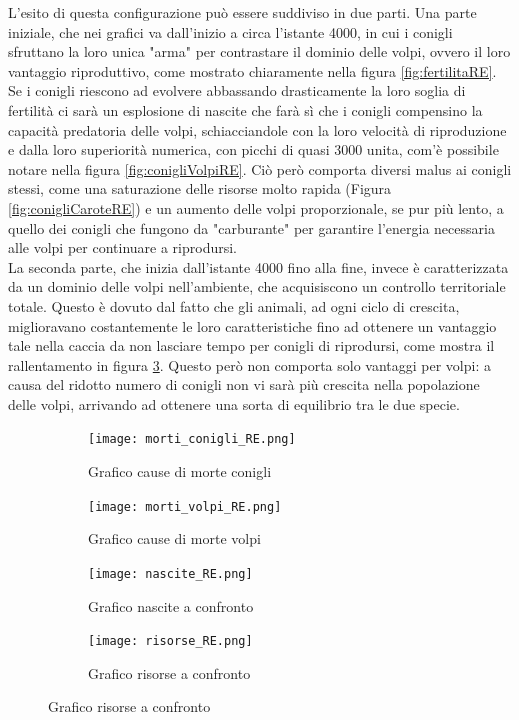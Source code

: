 \documentclass[11pt]{article}
\begin{document}
L'esito di questa configurazione può essere suddiviso in due parti. Una parte iniziale, che nei grafici va dall'inizio a circa l'istante 4000, in cui i conigli sfruttano la loro unica "arma" per contrastare il dominio delle volpi, ovvero il loro vantaggio riproduttivo, come mostrato chiaramente nella figura \ref{fig:fertilitaRE}. Se i conigli riescono ad evolvere abbassando drasticamente la loro soglia di fertilità ci sarà un esplosione di nascite che farà sì che i conigli compensino la capacità predatoria delle volpi, schiacciandole con la loro velocità di riproduzione e dalla loro superiorità numerica, con picchi di quasi 3000 unita, com'è possibile notare nella figura \ref{fig:conigliVolpiRE}.
Ciò però comporta diversi malus ai conigli stessi, come una saturazione delle risorse molto rapida (Figura \ref{fig:conigliCaroteRE}) e un aumento delle volpi proporzionale, se pur più lento, a quello dei conigli che fungono da "carburante" per garantire l'energia necessaria alle volpi per continuare a riprodursi. \\
La seconda parte, che inizia dall'istante 4000 fino alla fine, invece è caratterizzata da un dominio delle volpi nell'ambiente, che acquisiscono un controllo territoriale totale. Questo è dovuto dal fatto che gli animali, ad ogni ciclo di crescita, miglioravano costantemente le loro caratteristiche fino ad ottenere un vantaggio tale nella caccia da non lasciare tempo per conigli di riprodursi, come mostra il rallentamento in figura \ref{fig:nasciteRE}. Questo però non comporta solo vantaggi per volpi: a causa del ridotto numero di conigli non vi sarà più crescita nella popolazione delle volpi, arrivando ad ottenere una sorta di equilibrio tra le due specie.

\newpage

\begin{figure}[h!]
	\hspace{-5mm}
	\begin{subfigure}{.52\textwidth}
         \centering
         \texttt{[image: morti\_conigli\_RE.png]}
         \caption{Grafico cause di morte conigli}
         \label{fig:morteConigliRE}
	\end{subfigure}
	\begin{subfigure}{.55\textwidth}
		\hspace{12mm}
		\centering
        \texttt{[image: morti\_volpi\_RE.png]}
        \caption{Grafico cause di morte volpi}
        \label{fig:morteVolpiRE}
	\end{subfigure}

	\hspace{-5mm}
	\begin{subfigure}{.52\textwidth}
         \centering
         \texttt{[image: nascite\_RE.png]}
         \caption{Grafico nascite a confronto}
         \label{fig:nasciteRE}
	\end{subfigure}
	\begin{subfigure}{.55\textwidth}
		\hspace{12mm}
		\centering
        \texttt{[image: risorse\_RE.png]}
        \caption{Grafico risorse a confronto}
        \label{fig:risorseRE}
	\end{subfigure}
\end{figure}
\end{document}
